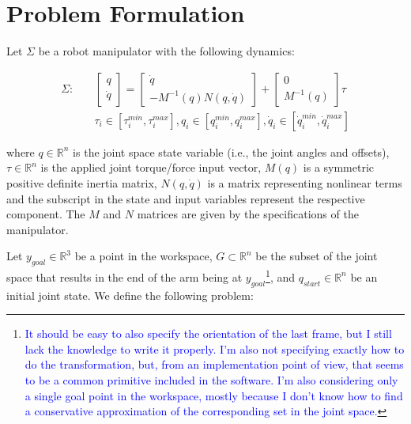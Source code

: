 \documentclass[12pt]{article}
\newcommand\fran[1]{\textcolor{blue}{#1}}
\newcommand\ffran[1]{\textcolor{blue}{\footnote{\fran{#1}}}}
\begin{document}
\section{Problem Formulation}
\label{sec:problem_formulation}

Let $\Sigma$ be a robot manipulator with the following dynamics:

\begin{equation}
    \label{eq:sigma}
    \begin{split}
        \Sigma : \quad &\left [ \begin{matrix} q \\ \dot q \end{matrix}\right ] = 
                        \left [ \begin{matrix}
                                \dot q \\ - M^{-1}(q) N(q, \dot q)
                        \end{matrix}\right ] + 
                        \left [ \begin{matrix}
                                0 \\ M^{-1}(q)
                        \end{matrix} \right ] \tau \\
                        &\tau_i \in [\tau_i^{min}, \tau_i^{max}], q_i \in [q_i^{min}, q_i^{max}],
                        \dot q_i \in [\dot q_i^{min}, \dot q_i^{max}]
    \end{split}
\end{equation}

where $q \in \mathbb{R}^n$ is the joint space state variable (i.e., the joint angles and offsets), $\tau \in \mathbb{R}^n$ is the applied joint torque/force input vector, $M(q)$ is a symmetric positive definite inertia matrix, $N(q, \dot q)$ is a matrix representing nonlinear terms and the subscript in the state and input variables represent the respective component. The $M$ and $N$ matrices are given by the specifications of the manipulator.

Let $y_{goal} \in \mathbb{R}^3$ be a point in the workspace, $G \subset \mathbb{R}^n$ be the subset of the joint space that results in the end of the arm being at $y_{goal}$\ffran{It should be easy to also specify the orientation of the last frame, but I still lack the knowledge to write it properly. I'm also not specifying exactly how to do the transformation, but, from an implementation point of view, that seems to be a common primitive included in the software. I'm also considering only a single goal point in the workspace, mostly because I don't know how to find a conservative approximation of the corresponding set in the joint space.}, and $q_{start} \in \mathbb{R}^n$ be an initial joint state. We define the following problem:
\end{document}
